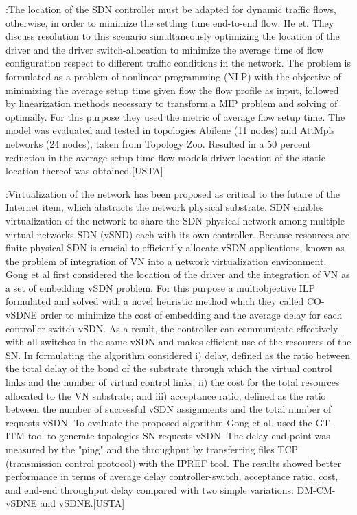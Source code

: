 \documentclass[a4paper,10pt]{article}
\begin{document}
\cite{HeBa17}:The location of the SDN controller must be adapted for dynamic traffic flows, otherwise, in order to minimize the settling time end-to-end flow. He et. They discuss resolution to this scenario simultaneously optimizing the location of the driver and the driver switch-allocation to minimize the average time of flow configuration respect to different traffic conditions in the network. The problem is formulated as a problem of nonlinear programming (NLP) with the objective of minimizing the average setup time given flow the flow profile as input, followed by linearization methods necessary to transform a MIP problem and solving of optimally. For this purpose they used the metric of average flow setup time.
The model was evaluated and tested in topologies Abilene (11 nodes) and AttMpls networks (24 nodes), taken from Topology Zoo. Resulted in a 50 percent reduction in the average setup time flow models driver location of the static location thereof was obtained.[USTA]



\cite{GoGi17}:Virtualization of the network has been proposed as critical to the future of the Internet item, which abstracts the network physical substrate. SDN enables virtualization of the network to share the SDN physical network among multiple virtual networks SDN (vSND) each with its own controller. Because resources are finite physical SDN is crucial to efficiently allocate vSDN applications, known as the problem of integration of VN into a network virtualization environment. Gong et al first considered the location of the driver and the integration of VN as a set of embedding vSDN problem. For this purpose a multiobjective ILP formulated and solved with a novel heuristic method which they called CO-vSDNE order to minimize the cost of embedding and the average delay for each controller-switch vSDN. As a result, the controller can communicate effectively with all switches in the same vSDN and makes efficient use of the resources of the SN. In formulating the algorithm considered i) delay, defined as the ratio between the total delay of the bond of the substrate through which the virtual control links and the number of virtual control links; ii) the cost for the total resources allocated to the VN substrate; and iii) acceptance ratio, defined as the ratio between the number of successful vSDN assignments and the total number of requests vSDN.
To evaluate the proposed algorithm Gong et al. used the GT-ITM tool to generate topologies SN requests vSDN. The delay end-point was measured by the "ping" and the throughput by transferring files TCP (transmission control protocol) with the IPREF tool. The results showed better performance in terms of average delay controller-switch, acceptance ratio, cost, and end-end throughput delay compared with two simple variations: DM-CM-vSDNE and vSDNE.[USTA]
\end{document}
